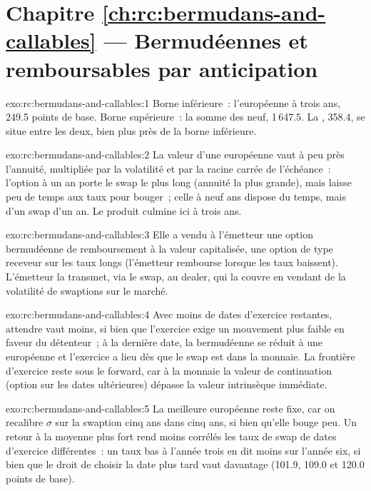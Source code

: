 \section*{Chapitre \ref{ch:rc:bermudans-and-callables} --- Bermudéennes et remboursables par anticipation}

\begin{solution}{exo:rc:bermudans-and-callables:1}
Borne inférieure~: l'européenne à trois ans, 249.5 points de base.
Borne supérieure~: la somme des neuf, 1\,647.5. La , 358.4, se situe entre les deux, bien plus près de la borne inférieure.
\end{solution}

\begin{solution}{exo:rc:bermudans-and-callables:2}
La valeur d'une européenne vaut à peu près l'annuité, multipliée par la volatilité et par la racine carrée de l'échéance~: l'option
à un an porte le swap le plus long (annuité la plus grande), mais laisse peu de temps
aux taux pour bouger~; celle à neuf ans dispose du temps, mais d'un swap d'un an. Le produit culmine
ici à trois ans.
\end{solution}

\begin{solution}{exo:rc:bermudans-and-callables:3}
Elle a vendu à l'émetteur une option bermudéenne de remboursement à la valeur capitalisée, une
option de type receveur sur les taux longs (l'émetteur rembourse lorsque les taux baissent). L'émetteur
la transmet, via le swap, au dealer, qui la couvre en vendant de la volatilité de swaptions sur le
marché.
\end{solution}

\begin{solution}{exo:rc:bermudans-and-callables:4}
Avec moins de dates d'exercice restantes, attendre vaut moins, si bien que l'exercice exige un
mouvement plus faible en faveur du détenteur~; à la dernière date, la bermudéenne se réduit à une européenne et
l'exercice a lieu dès que le swap est dans la monnaie. La frontière d'exercice reste sous le forward, car à la
monnaie la valeur de continuation (option sur les dates ultérieures)
dépasse la valeur intrinsèque immédiate.
\end{solution}

\begin{solution}{exo:rc:bermudans-and-callables:5}
La meilleure européenne reste fixe, car on recalibre $\sigma$ sur la swaption cinq ans dans cinq ans, si bien qu'elle bouge
peu. Un retour à la moyenne plus fort rend moins corrélés les taux de swap de dates d'exercice différentes~: un taux bas
à l'année trois en dit moins sur l'année six, si bien que le droit de choisir la date plus tard vaut davantage
(101.9, 109.0 et 120.0 points de base).
\end{solution}

